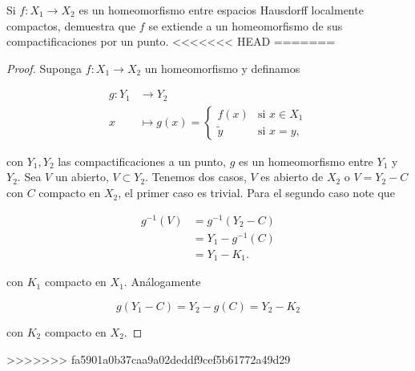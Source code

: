 
\item Si $f: X_1 \rightarrow X_2$ es un homeomorfismo entre espacios Hausdorff localmente compactos, demuestra que $f$ se extiende a un homeomorfismo de sus compactificaciones por un punto.
<<<<<<< HEAD
=======

\begin{proof}
    Suponga $f:X_1\to X_2$ un homeomorfismo y definamos

    \begin{align*}
        g : Y_1 &\longrightarrow Y_2 \\
        x &\longmapsto g(x) = \begin{cases}
            f(x) &\text{si } x\in X_1\\
            \tilde{y} &\text{si }x=y,
        \end{cases}
    \end{align*}

    con $Y_1, Y_2$ las compactificaciones a un punto, $g$ es un homeomorfismo entre $Y_1$ y $Y_2$. Sea $V$ un abierto, $V\subset Y_2$. Tenemos dos casos, $V$ es abierto de $X_2$ o $V=Y_2-C$ con $C$ compacto en $X_2$, el primer caso es trivial. Para el segundo caso note que 

    \begin{align*}
        g^{-1}(V)&=g^{-1}(Y_2-C)\\
        &=Y_1-g^{-1}(C)\\
        &=Y_1- K_1
    .\end{align*}

    con $K_1$ compacto en $X_1$. Análogamente 

    $$g(Y_1-C)=Y_2-g(C)=Y_2-K_2$$

    con $K_2$ compacto en $X_2$.
        
\end{proof}
>>>>>>> fa5901a0b37caa9a02deddf9cef5b61772a49d29
